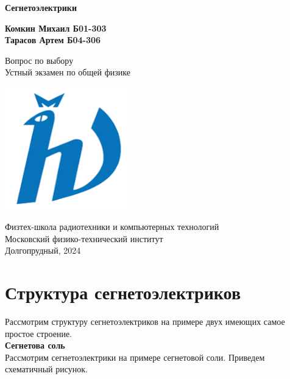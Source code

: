 \documentclass[12pt]{article}
\begin{document}
    \begin{titlepage}
        \begin{center}
            \vspace*{1cm}

            \Huge
            \textbf{Сегнетоэлектрики}

            \vspace{1.5cm}

            \Large
            \textbf{Комкин Михаил Б01-303\\
                    Тарасов Артем Б04-306}

            \vfill

            Вопрос по выбору \\
            Устный экзамен по общей физике

            \vspace{0.8cm}

            \includegraphics[width=0.4\textwidth]{university_logo.png}

            Физтех-школа радиотехники и компьютерных технологий\\
            Московский физико-технический институт\\
            Долгопрудный, 2024
        \end{center}
    \end{titlepage}




    \section{Структура сегнетоэлектриков}
    Рассмотрим структуру сегнетоэлектриков на примере двух имеющих самое простое строение.\\
    \textbf{Сегнетова соль}\\
    Рассмотрим сегнетоэлектрики на примере сегнетовой соли. Приведем схематичный рисунок.
    
\end{document}
